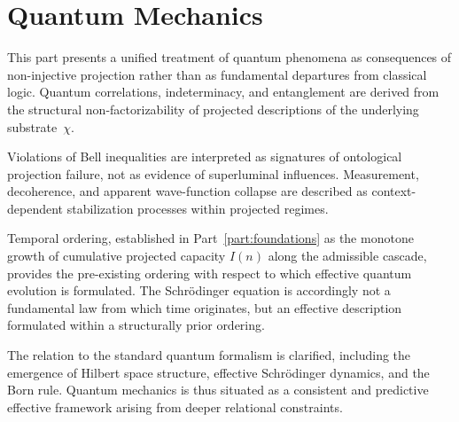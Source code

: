 \clearpage
\part{Quantum Mechanics}
  \label{part:quantum-mechanics}

  This part presents a unified treatment of quantum phenomena as consequences of non-injective
  projection rather than as fundamental departures from classical logic.
  Quantum correlations, indeterminacy, and entanglement are derived from the structural
  non-factorizability of projected descriptions of the underlying substrate~$\chi$.

  Violations of Bell inequalities are interpreted as signatures of ontological projection
  failure, not as evidence of superluminal influences.
  Measurement, decoherence, and apparent wave-function collapse are described as
  context-dependent stabilization processes within projected regimes.

  Temporal ordering, established in Part~\ref{part:foundations} as the monotone growth
  of cumulative projected capacity $I(n)$ along the admissible cascade, provides the
  pre-existing ordering with respect to which effective quantum evolution is formulated.
  The Schr\"odinger equation is accordingly not a fundamental law from which time
  originates, but an effective description formulated within a structurally prior ordering.

  The relation to the standard quantum formalism is clarified, including the emergence of
  Hilbert space structure, effective Schr\"odinger dynamics, and the Born rule.
  Quantum mechanics is thus situated as a consistent and predictive effective framework
  arising from deeper relational constraints.

